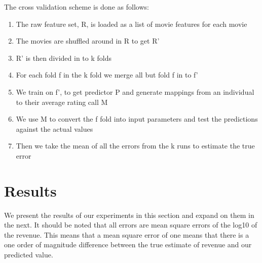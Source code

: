 \documentclass[conference]{IEEEtran}
\begin{document}
The cross validation scheme is done as follows: 
\begin{enumerate}
\item The raw feature set, R, is loaded as a list of movie features for each movie
\item The movies are shuffled around in R to get R' 
\item R' is then divided in to k folds 
\item For each fold f in the k fold we merge all but fold f in to f' 
\item We train on f', to get predictor P and generate mappings from an individual to their average rating call M 
\item We use M to convert the f fold into input parameters and test the predictions against the actual values 
\item Then we take the mean of all the errors from the k runs to estimate the true error 
\end{enumerate}

\section{Results}

We present the results of our experiments in this section and expand 
on them in the next. It should be noted that all errors are mean square errors of
the log10 of the revenue. This means that a mean square error of 
one means that there is a one order of magnitude difference between the true estimate 
of revenue and our predicted value. 
\end{document}
